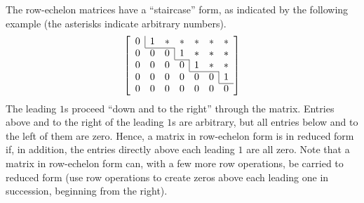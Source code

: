 \noindent The row-echelon matrices have a ``staircase'' form, as indicated by the following example (the asterisks indicate arbitrary numbers).
\begin{equation*}
\leftB \begin{array}{rrrrrrr}
	\multicolumn{1}{r|}{0} & 1 & * & * & * & * & * \\ 
	\cline{2-3}
	0 & 0 & \multicolumn{1}{r|}{0} & 1 & * & * & * \\
	\cline{4-4}
	0 & 0 & 0 & \multicolumn{1}{r|}{0} & 1 & * & * \\
	\cline{5-6}
	0 & 0 & 0 & 0 & 0 & \multicolumn{1}{r|}{0} & 1 \\
	\cline{7-7}
	0 & 0 & 0 & 0 & 0 & 0 & 0 
\end{array} \rightB
\end{equation*}
The leading $1$s proceed ``down and to the right'' through the matrix. Entries above and to the right of the leading $1$s are arbitrary, but all entries below and to the left of them are zero. Hence, a matrix in row-echelon form is in reduced form if, in addition, the entries directly above each leading $1$ are all zero. Note that a matrix in row-echelon form can, with a few more row operations, be carried to reduced form (use row operations to create zeros above each leading one in succession, beginning from the right).

